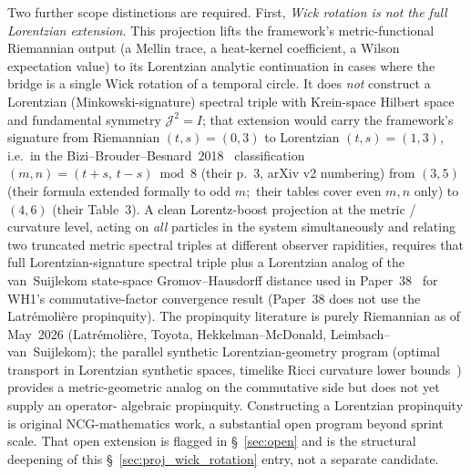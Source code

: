 \documentclass[11pt]{article}
\begin{document}
Two further scope distinctions are required.
First, \emph{Wick rotation is not the full Lorentzian extension.}
This projection lifts the framework's metric-functional Riemannian
output (a Mellin trace, a heat-kernel coefficient, a Wilson
expectation value) to its Lorentzian analytic continuation in
cases where the bridge is a single Wick rotation of a temporal
circle.  It does \emph{not} construct a Lorentzian (Minkowski-signature)
spectral triple with Krein-space Hilbert space and fundamental
symmetry $\mathcal{J}^2 = I$; that extension would carry the
framework's signature from Riemannian $(t, s) = (0, 3)$ to Lorentzian
$(t, s) = (1, 3)$, i.e.\ in the
Bizi--Brouder--Besnard~2018~\cite{bizi_brouder_besnard2018}
classification $(m, n) = (t + s,\, t - s) \bmod 8$ (their p.~3, arXiv v2
numbering) from $(3, 5)$ (their formula extended formally to odd $m$;\
their tables cover even $m, n$ only) to $(4, 6)$ (their Table~3).  A clean Lorentz-boost projection at
the metric / curvature level, acting on \emph{all} particles in the
system simultaneously and relating two truncated metric spectral
triples at different observer rapidities, requires that full
Lorentzian-signature spectral triple plus a Lorentzian analog of
the van~Suijlekom state-space Gromov--Hausdorff distance used in
Paper~38~\cite{paper38} for WH1's commutative-factor convergence result (Paper~38 does not
use the Latr\'emoli\`ere propinquity).  The propinquity literature is purely
Riemannian as of May~2026 (Latr\'emoli\`ere, Toyota,
Hekkelman--McDonald, Leimbach--van~Suijlekom); the parallel synthetic
Lorentzian-geometry program (optimal transport in Lorentzian synthetic
spaces, timelike Ricci curvature lower
bounds~\cite{cavalletti_mondino2024}) provides a metric-geometric
analog on the commutative side but does not yet supply an operator-
algebraic propinquity.  Constructing a Lorentzian propinquity is
original NCG-mathematics work, a substantial open program beyond
sprint scale.  That open extension is flagged in
\S~\ref{sec:open} and is the structural deepening of this
\S~\ref{sec:proj_wick_rotation} entry, not a separate candidate.
\end{document}
